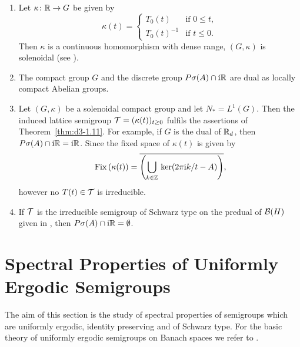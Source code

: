 \begin{remark}\label{rem:d3-1.14}
\begin{enumerate}[\upshape (i), wide, labelindent=.25em]
\item Let $\kappa \colon \mathbb{R} \to G$ be given by
\[
\kappa(t) = \begin{cases}
T_{0}(t) & \text{if } 0 \leq t , \\
T_{0}(t)^{-1} & \text{if } t \leq 0.
\end{cases}
\]
Then $\kappa$ is a continuous homomorphism with dense range, \ie $(G,\kappa)$ is solenoidal (see \textcite{hewittross:1963}).

\item 
The compact group $G$ and the discrete group $P\sigma(A) \cap \mathrm{i}\mathbb{R}$ are dual as locally compact Abelian groups.

\item 
Let $(G,\kappa)$ be a solenoidal compact group and let $N_{*} = L^{1}(G)$.
Then the induced lattice semigroup $\TT = (\kappa(t))_{t \geq 0}$ fulfils the assertions of Theorem~\ref{thm:d3-1.11}.
For example, if\/ $G$ is the dual of\/ $\mathbb{R}_{d}$, then $P\sigma(A) \cap \mathrm{i}\mathbb{R} = \mathrm{i}\mathbb{R}$.
Since the fixed space of\/ $\kappa(t)$ is given by
\[
	\mathop{}\mathrm{Fix}\left(\kappa(t)\right) = 
    \overline{ \left(\bigcup_{k \in \mathbb{Z}} \mathop{}\mathrm{ker}(2\pi \mathrm{i} k /t - A) \right) } ,
\]
however no $T(t) \in \mathcal{T}$ is irreducible.

\item 
If\/ $\mathcal{T}$ is the irreducible semigroup of Schwarz type on the predual of\/ $\mathcal{B}(H)$ given in \textcite{evans:1977}, then $P\sigma(A) \cap \mathrm{i}\mathbb{R} = \emptyset$.
\end{enumerate}
\end{remark}
\section{Spectral Properties of Uniformly Ergodic Semigroups}\label{sec:d3-2}
The aim of this section is the study of spectral properties of semigroups which are uniformly ergodic, identity preserving and of Schwarz type.
For the basic theory of uniformly ergodic semigroups on Banach spaces we refer to \textcite{dunfordschwartz:1958}.

